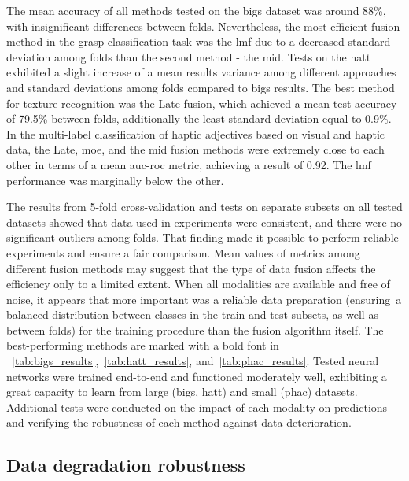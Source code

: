 \documentclass[a4paper, 10pt, twoside]{report}
\begin{document}
The mean accuracy of all methods tested on the \acrshort{bigs} dataset was around 88\%, with insignificant differences between folds. Nevertheless, the most efficient fusion method in the grasp classification task was the \acrshort{lmf} due to a decreased standard deviation among folds than the second method - the \acrshort{mid}. Tests on the \acrshort{hatt} exhibited a slight increase of a mean results variance among different approaches and standard deviations among folds compared to \acrshort{bigs} results. The best method for texture recognition was the Late fusion, which achieved a mean test accuracy of 79.5\% between folds, additionally the least standard deviation equal to 0.9\%. In the multi-label classification of haptic adjectives based on visual and haptic data, the Late, \acrshort{moe}, and the \acrshort{mid} fusion methods were extremely close to each other in terms of a mean \acrshort{auc}-\acrshort{roc} metric, achieving a result of 0.92. The \acrshort{lmf} performance was marginally below the other. 

The results from 5-fold cross-validation and tests on separate subsets on all tested datasets showed that data used in experiments were consistent, and there were no significant outliers among folds. That finding made it possible to perform reliable experiments and ensure a fair comparison. Mean values of metrics among different fusion methods may suggest that the type of data fusion affects the efficiency only to a limited extent. When all modalities are available and free of noise, it appears that more important was a reliable data preparation (\mbox{\eg ensuring a} balanced distribution between classes in the train and test subsets, as well as between folds) for the training procedure than the fusion algorithm itself. The best-performing methods are marked with a bold font in \Table~\ref{tab:bigs_results},~\ref{tab:hatt_results}, and~\ref{tab:phac_results}. Tested neural networks were trained end-to-end and functioned moderately well, exhibiting a great capacity to learn from large (\acrshort{bigs}, \acrshort{hatt}) and small (\acrshort{phac}) datasets. Additional tests were conducted on the impact of each modality on predictions and verifying the robustness of each method against data deterioration.

\subsection{Data degradation robustness}
\label{part:experiments:fusion:multi:degradation}
\end{document}
